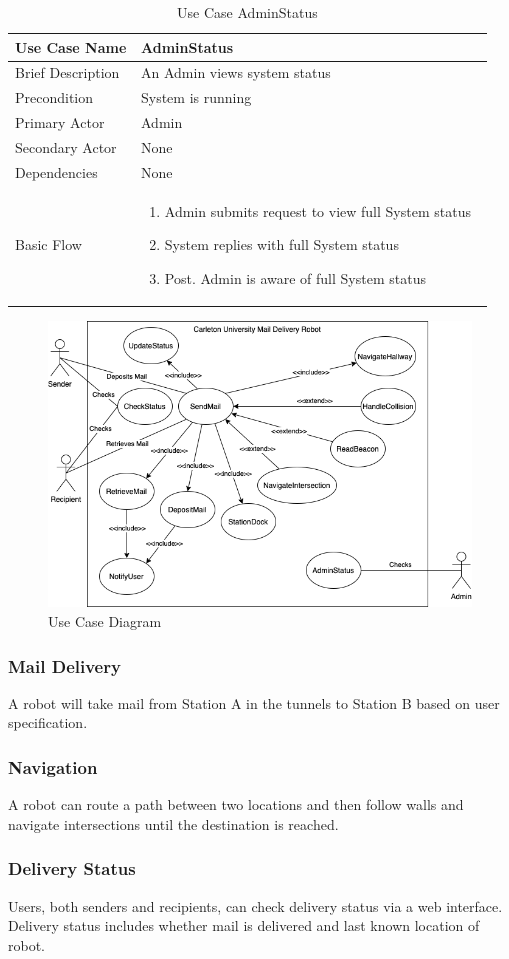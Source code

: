 \documentclass[12pt]{report}
\newcommand\tabularhead[1]{
    \begin{table}[H]
      \caption{Use Case #1}
      \begin{tabular}{|p{0.25\linewidth}|p{0.7\linewidth}|}
        \hline
        \textbf{Use Case Name} & \textbf{#1} \\
        \hline}
\newcommand\addrow[2]{#1 &#2\\ \hline}
\newcommand\addmulrow[2]{ \begin{minipage}[t][][t]{4cm}\raggedright#1\end{minipage} 
         &\begin{minipage}[t][][t]{10cm}
          \begin{enumerate} #2   \end{enumerate}
          \end{minipage} \vspace{0.1cm} \\ \hline}
\newenvironment{usecase}{\tabularhead}
    {\end{tabular}\end{table}}
\begin{document}
\begin{usecase}{AdminStatus}
    \addrow{Brief Description}{An Admin views system status}
    \addrow{Precondition}{System is running}
    \addrow{Primary Actor}{Admin}
    \addrow{Secondary Actor}{None}
    \addrow{Dependencies}{None}
    \addmulrow{Basic Flow}{
        \item Admin submits request to view full System status
        \item System replies with full System status
        \item[Post.] Admin is aware of full System status
    }
\end{usecase}

\begin{figure}[H]
\caption{Use Case Diagram}
\includegraphics[scale=0.6]{images/UseCaseDiagram.png}
\centering
\end{figure}
\subsubsection{Mail Delivery}
A robot will take mail from Station A in the tunnels to Station B based on user specification.
\subsubsection{Navigation}
A robot can route a path between two locations and then follow walls and navigate intersections until the destination is reached.
\subsubsection{Delivery Status}
Users, both senders and recipients, can check delivery status via a web interface. Delivery status includes whether mail is delivered and last known location of robot.
\end{document}
